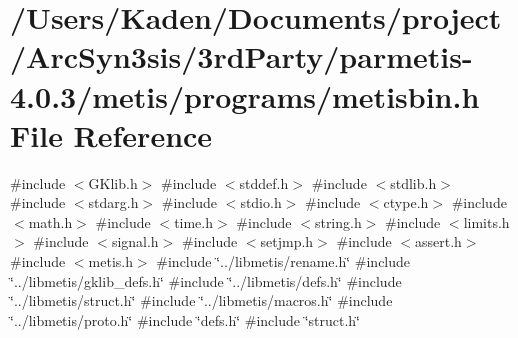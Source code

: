 \hypertarget{a00320}{}\section{/\+Users/\+Kaden/\+Documents/project/\+Arc\+Syn3sis/3rd\+Party/parmetis-\/4.0.3/metis/programs/metisbin.h File Reference}
\label{a00320}
{\ttfamily \#include $<$G\+Klib.\+h$>$}\newline
{\ttfamily \#include $<$stddef.\+h$>$}\newline
{\ttfamily \#include $<$stdlib.\+h$>$}\newline
{\ttfamily \#include $<$stdarg.\+h$>$}\newline
{\ttfamily \#include $<$stdio.\+h$>$}\newline
{\ttfamily \#include $<$ctype.\+h$>$}\newline
{\ttfamily \#include $<$math.\+h$>$}\newline
{\ttfamily \#include $<$time.\+h$>$}\newline
{\ttfamily \#include $<$string.\+h$>$}\newline
{\ttfamily \#include $<$limits.\+h$>$}\newline
{\ttfamily \#include $<$signal.\+h$>$}\newline
{\ttfamily \#include $<$setjmp.\+h$>$}\newline
{\ttfamily \#include $<$assert.\+h$>$}\newline
{\ttfamily \#include $<$metis.\+h$>$}\newline
{\ttfamily \#include \char`\"{}../libmetis/rename.\+h\char`\"{}}\newline
{\ttfamily \#include \char`\"{}../libmetis/gklib\+\_\+defs.\+h\char`\"{}}\newline
{\ttfamily \#include \char`\"{}../libmetis/defs.\+h\char`\"{}}\newline
{\ttfamily \#include \char`\"{}../libmetis/struct.\+h\char`\"{}}\newline
{\ttfamily \#include \char`\"{}../libmetis/macros.\+h\char`\"{}}\newline
{\ttfamily \#include \char`\"{}../libmetis/proto.\+h\char`\"{}}\newline
{\ttfamily \#include \char`\"{}defs.\+h\char`\"{}}\newline
{\ttfamily \#include \char`\"{}struct.\+h\char`\"{}}\newline
